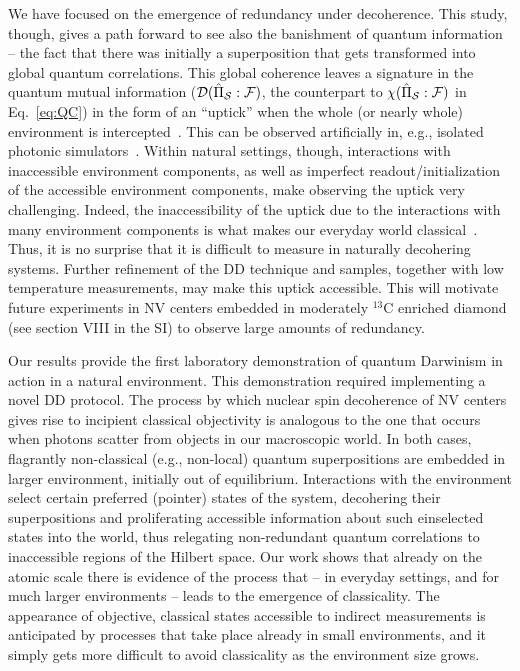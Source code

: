 \documentclass[aps,prl,floatfix,twocolumn,footinbib,superscriptaddress]{revtex4-1}
\begin{document}
We have focused on the emergence of redundancy under decoherence. This study, though, gives a path forward to see also the banishment of quantum information -- the fact that there was initially a superposition that gets transformed into global quantum correlations. This global coherence leaves a signature in the quantum mutual information ($\mathcal{D}(\hat{\Pi}_{\mathcal{S}}:\mathcal{F})$, the counterpart to $\chi ( \hat{\Pi}_{\mathcal{S}}:\mathcal{F} )$ in Eq.~\eqref{eq:QC}) in the form of an ``uptick'' when the whole (or nearly whole) environment is intercepted~\cite{Zwolak13-1}.  This can be observed artificially in, e.g., isolated photonic simulators~\cite{Ciampini18-1,Chen18-1}. Within natural settings, though, interactions with inaccessible environment components, as well as imperfect readout/initialization of the accessible environment components, make observing the uptick very challenging. Indeed, the inaccessibility of the uptick due to the interactions with many environment components is what makes our everyday world classical~\cite{Zwolak13-1}. Thus, it is no surprise that it is difficult to measure in naturally decohering systems. Further refinement of the DD technique and samples, together with low temperature measurements, may make this uptick accessible. This will motivate future experiments in NV centers embedded in moderately $^{13}$C enriched diamond (see section \RN{8} in the SI) to observe large amounts of redundancy.

Our results provide the first laboratory demonstration of quantum Darwinism in action in a natural environment. This demonstration required implementing a novel DD protocol. The process by which nuclear spin decoherence of NV centers gives rise to incipient classical objectivity is analogous to the one that occurs when photons scatter from objects in our macroscopic world. In both cases, flagrantly non-classical (e.g., non-local) quantum superpositions are embedded in larger environment, initially out of equilibrium. Interactions with the environment select certain preferred (pointer) states of the system, decohering their superpositions and proliferating accessible information about such einselected states into the world, thus relegating non-redundant quantum correlations to inaccessible regions of the Hilbert space. Our work shows that already on the atomic scale there is evidence of the process that -- in everyday settings, and for much larger environments -- leads to the emergence of classicality. The appearance of objective, classical states accessible to indirect measurements is anticipated by processes that take place already in small environments, and it simply gets more difficult to avoid classicality as the environment size grows. \\
\end{document}
